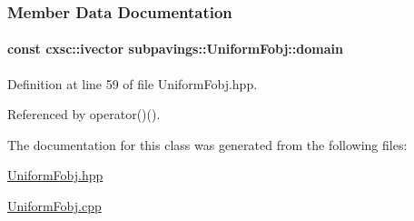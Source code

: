 \subsubsection{\-Member \-Data \-Documentation}
\hypertarget{classsubpavings_1_1UniformFobj_add106ff804e87898e5a6416ad0a72913}{
\paragraph[{domain}]{\setlength{\rightskip}{0pt plus 5cm}const cxsc\-::ivector {\bf subpavings\-::\-Uniform\-Fobj\-::domain}}}\label{classsubpavings_1_1UniformFobj_add106ff804e87898e5a6416ad0a72913}


\-Definition at line 59 of file \-Uniform\-Fobj.\-hpp.



\-Referenced by operator()().



\-The documentation for this class was generated from the following files\-:\begin{DoxyCompactItemize}
\item 
\hyperlink{UniformFobj_8hpp}{\-Uniform\-Fobj.\-hpp}\item 
\hyperlink{UniformFobj_8cpp}{\-Uniform\-Fobj.\-cpp}\end{DoxyCompactItemize}
